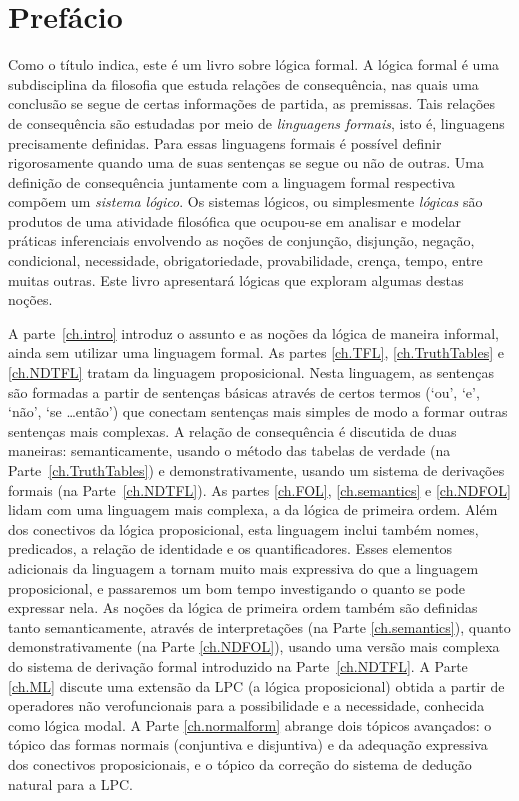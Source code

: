 \chapter{Prefácio}

Como o título indica, este é um livro sobre lógica formal.
A lógica formal é uma subdisciplina da filosofia que estuda relações de consequência, nas quais uma conclusão se segue de certas informações de partida, as premissas.
Tais relações de consequência são estudadas por meio de \emph{linguagens formais}, isto é, linguagens precisamente definidas.
Para essas linguagens formais é possível definir rigorosamente quando uma de suas sentenças se segue ou não de outras.
Uma definição de consequência juntamente com a linguagem formal respectiva compõem um \emph{sistema lógico}.
Os sistemas lógicos, ou simplesmente \emph{lógicas} são produtos de uma atividade filosófica que ocupou-se em analisar e modelar práticas inferenciais envolvendo as noções de conjunção, disjunção, negação, condicional, necessidade, obrigatoriedade, provabilidade, crença, tempo, entre muitas outras.
Este livro apresentará lógicas que exploram algumas destas noções.


A parte~\ref{ch.intro} introduz o assunto e as noções da lógica de maneira informal, ainda sem utilizar uma linguagem formal.
As partes \ref{ch.TFL}, \ref{ch.TruthTables} e \ref{ch.NDTFL} tratam da linguagem proposicional.  Nesta linguagem, as sentenças são formadas a partir de sentenças básicas através de certos termos (`ou', `e', `não', `se \dots então') que conectam sentenças mais simples de modo a formar outras sentenças mais complexas.
A relação de consequência é discutida de duas maneiras:
semanticamente, usando o método das tabelas de verdade (na Parte~\ref{ch.TruthTables}) e demonstrativamente, usando um sistema de derivações formais (na Parte~\ref{ch.NDTFL}).
As partes \ref{ch.FOL}, \ref{ch.semantics} e \ref{ch.NDFOL} lidam com uma linguagem mais complexa, a da lógica de primeira ordem.
Além dos conectivos da lógica proposicional, esta linguagem inclui também nomes, predicados, a relação de identidade e os quantificadores.
Esses elementos adicionais da linguagem a tornam muito mais expressiva do que a linguagem proposicional, e passaremos um bom tempo investigando o quanto se pode expressar nela.
As noções da lógica de primeira ordem também são definidas tanto semanticamente, através de interpretações (na Parte \ref{ch.semantics}), quanto demonstrativamente (na Parte \ref{ch.NDFOL}), usando uma versão mais complexa do sistema de derivação formal introduzido na Parte~\ref{ch.NDTFL}.
A Parte \ref{ch.ML} discute uma extensão da LPC (a lógica proposicional) obtida a partir de operadores não verofuncionais para a possibilidade e a necessidade, conhecida como lógica modal.
A Parte \ref{ch.normalform} abrange dois tópicos avançados:
o tópico das formas normais (conjuntiva e disjuntiva) e da adequação expressiva dos conectivos proposicionais, e o tópico da correção do sistema de dedução natural para a LPC.

